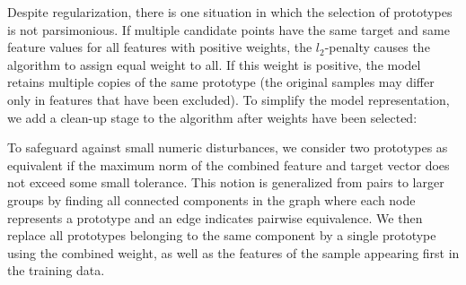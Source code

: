 %
Despite regularization, there is one situation in which the selection of prototypes is not parsimonious.
If multiple candidate points have the same target and same feature values for all features with positive weights, the $l_2$-penalty causes the algorithm to assign equal weight to all.
If this weight is positive, the model retains multiple copies of the same prototype (the original samples may differ only in features that have been excluded).
To simplify the model representation, we add a clean-up stage to the algorithm after weights have been selected:\par
%
To safeguard against small numeric disturbances, we consider two prototypes as equivalent if the maximum norm of the combined feature and target vector does not exceed some small tolerance.
This notion is generalized from pairs to larger groups by finding all connected components in the graph where each node represents a prototype and an edge indicates pairwise equivalence.
We then replace all prototypes belonging to the same component by a single prototype using the combined weight, as well as the features of the sample appearing first in the training data.
\endinput

